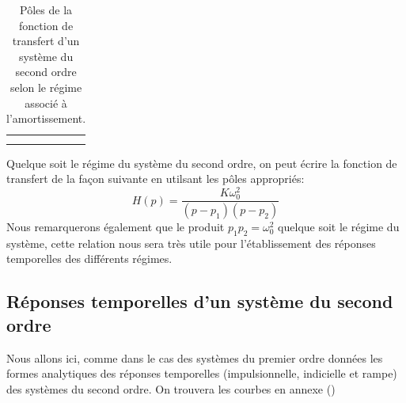 \begin{table}[!h]
\begin{center}
{\begin{tabular}{M{4cm}M{4.0cm}M{8.0cm}N}
   &\\ [1.5em]
        \hhline{===}
    \end{tabular}
}
    \end{center}
    \caption{Pôles de la fonction de transfert d'un système du second ordre 
    selon le régime associé à l'amortissement.\label{tab-poles_2nd}}
\end{table}
Quelque soit le régime du système du second ordre, on peut écrire la fonction de transfert de la façon suivante en 
utilsant les pôles appropriés:
$$
H(p)=\dfrac{K\omega^2_0}{(p-p_1)(p-p_2)}
$$
Nous remarquerons également que le produit $p_1p_2=\omega^2_0$ quelque soit le régime du système, cette relation 
nous sera très utile pour l'établissement des réponses temporelles des différents régimes.

\subsection{Réponses temporelles d'un système du second ordre}
Nous allons ici, comme dans le cas des systèmes du premier ordre données les formes analytiques des
réponses temporelles (impulsionnelle, indicielle et rampe) des systèmes du second ordre.
On trouvera les courbes en annexe ()
